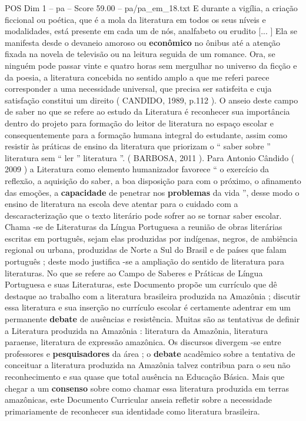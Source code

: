 \begin{textsample}{POS Dim 1 – pa – Score 59.00 – pa/pa\_em\_18.txt}
E durante a vigília, a criação ficcional ou poética, que é a mola da literatura em todos os seus níveis e modalidades, está presente em cada um de nós, analfabeto ou erudito [... ] Ela se manifesta desde o devaneio amoroso ou \textbf{econômico} no ônibus até a atenção fixada na novela de televisão ou na leitura seguida de um romance.
Ora, se ninguém pode passar vinte e quatro horas sem mergulhar no universo da ficção e da poesia, a literatura concebida no sentido amplo a que me referi parece corresponder a uma necessidade universal, que precisa ser satisfeita e cuja satisfação constitui um direito ( CANDIDO, 1989, p.112 ).
O anseio deste campo de saber no que se refere ao estudo da Literatura é reconhecer sua importância dentro do projeto para formação do leitor de literatura no espaço escolar e consequentemente para a formação humana integral do estudante, assim como resistir às práticas de ensino da literatura que priorizam o “ saber sobre ” literatura sem “ ler ” literatura ”. ( BARBOSA, 2011 ).
Para Antonio Cândido ( 2009 ) a Literatura como elemento humanizador favorece “ o exercício da reflexão, a aquisição do saber, a boa disposição para com o próximo, o afinamento das emoções, a \textbf{capacidade} de penetrar nos \textbf{problemas} da vida ”, desse modo o ensino de literatura na escola deve atentar para o cuidado com a descaracterização que o texto literário pode sofrer ao se tornar saber escolar.
Chama -se de Literaturas da Língua Portuguesa a reunião de obras literárias escritas em português, sejam elas produzidas por indígenas, negros, de ambiência regional ou urbana, produzidas de Norte a Sul do Brasil e de países que falam português ; deste modo justifica -se a ampliação do sentido de literatura para literaturas.
No que se refere ao Campo de Saberes e Práticas de Língua Portuguesa e suas Literaturas, este Documento propõe um currículo que dê destaque ao trabalho com a literatura brasileira produzida na Amazônia ; discutir essa literatura e sua inserção no currículo escolar é certamente adentrar em um permanente \textbf{debate} de ausências e resistência.
Muitas são as tentativas de definir a Literatura produzida na Amazônia : literatura da Amazônia, literatura paraense, literatura de expressão amazônica.
Os discursos divergem -se entre professores e \textbf{pesquisadores} da área ; o \textbf{debate} acadêmico sobre a tentativa de conceituar a literatura produzida na Amazônia talvez contribua para o seu não reconhecimento e sua quase que total ausência na Educação Básica.
Mais que chegar a um \textbf{consenso} sobre como chamar essa literatura produzida em terras amazônicas, este Documento Curricular anseia refletir sobre a necessidade primariamente de reconhecer sua identidade como literatura brasileira.

\end{textsample}
